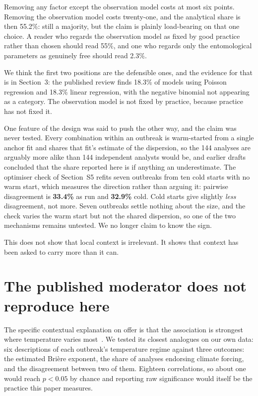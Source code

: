 \documentclass[11pt,a4paper]{article}
\begin{document}
Removing any factor except the observation model costs at most six points.
Removing the observation model costs twenty-one, and the analytical share is then
55.2\%: still a majority, but the claim is plainly load-bearing on that one
choice. A reader who regards the observation model as fixed by good practice
rather than chosen should read 55\%, and one who regards only the entomological
parameters as genuinely free should read 2.3\%.

We think the first two positions are the defensible ones, and the evidence for
that is in Section~3: the published review finds 18.3\% of models using Poisson
regression and 18.3\% linear regression, with the negative binomial not appearing
as a category. The observation model is not fixed by practice, because practice
has not fixed it.

One feature of the design was said to push the other way, and the claim was
never tested. Every combination within an outbreak is warm-started from a single
anchor fit and shares that fit's estimate of the dispersion, so the 144 analyses
are arguably more alike than 144 independent analysts would be, and earlier
drafts concluded that the share reported here is if anything an underestimate.
The optimiser check of Section~S5 refits seven outbreaks from ten
cold starts with no warm start, which measures the direction rather than arguing
it: pairwise disagreement is \textbf{33.4\%} as run and \textbf{32.9\%} cold.
Cold starts give slightly \emph{less} disagreement, not more. Seven outbreaks
settle nothing about the size, and the check varies the warm start but not the
shared dispersion, so one of the two mechanisms remains untested. We no longer
claim to know the sign.

This does not show that local context is irrelevant. It shows that context has
been asked to carry more than it can.

\section{The published moderator does not reproduce here}

The specific
contextual explanation on offer is that the association is strongest where
temperature varies most~\cite{kirk2024}. We tested its closest analogues on our
own data: six descriptions of each outbreak's temperature regime against three
outcomes: the estimated Brière exponent, the share of analyses endorsing climate
forcing, and the disagreement between two of them. Eighteen correlations, so
about one would reach $p < 0.05$ by chance and reporting raw significance would
itself be the practice this paper measures.
\end{document}
